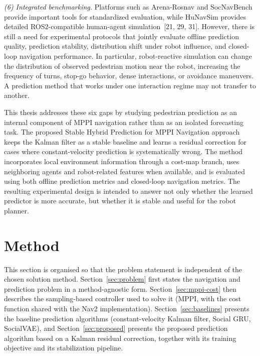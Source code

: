 \documentclass[12pt, a4paper]{article}
\begin{document}
\emph{(6) Integrated benchmarking.} Platforms such as Arena-Rosnav and SocNavBench provide important tools for standardized evaluation, while HuNavSim provides detailed ROS2-compatible human-agent simulation~[21, 29, 31]. However, there is still a need for experimental protocols that jointly evaluate offline prediction quality, prediction stability, distribution shift under robot influence, and closed-loop navigation performance. In particular, robot-reactive simulation can change the distribution of observed pedestrian motion near the robot, increasing the frequency of turns, stop-go behavior, dense interactions, or avoidance maneuvers. A prediction method that works under one interaction regime may not transfer to another.

This thesis addresses these six gaps by studying pedestrian prediction as an internal component of MPPI navigation rather than as an isolated forecasting task. The proposed Stable Hybrid Prediction for MPPI Navigation approach keeps the Kalman filter as a stable baseline and learns a residual correction for cases where constant-velocity prediction is systematically wrong. The method incorporates local environment information through a cost-map branch, uses neighboring agents and robot-related features when available, and is evaluated using both offline prediction metrics and closed-loop navigation metrics. The resulting experimental design is intended to answer not only whether the learned predictor is more accurate, but whether it is stable and useful for the robot planner.

\section{Method}
\label{sec:method}

This section is organised so that the problem statement is independent of the chosen solution method. Section~\ref{sec:problem} first states the navigation and prediction problem in a method-agnostic form. Section~\ref{sec:mppi-cost} then describes the sampling-based controller used to solve it (MPPI, with the cost function shared with the Nav2 implementation). Section~\ref{sec:baselines} presents the baseline prediction algorithms (constant-velocity Kalman filter, Social GRU, SocialVAE), and Section~\ref{sec:proposed} presents the proposed prediction algorithm based on a Kalman residual correction, together with its training objective and its stabilization pipeline.
\end{document}
